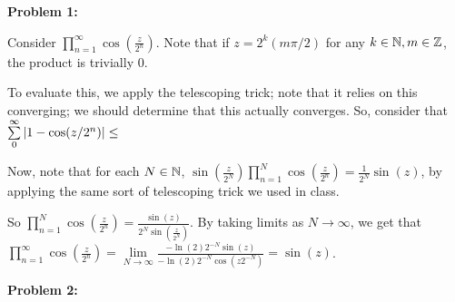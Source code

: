 \documentclass[a4paper,12pt]{article}
\begin{document}
{\bf Problem 1:}

Consider $\prod\limits_{n=1}^\infty \cos(\frac{z}{2^n})$. Note that if $z = 2^k(m\pi/2)$ for any $k \in \mathbb{N}, m \in \mathbb{Z}$, the product is trivially $0$. %

To evaluate this, we apply the telescoping trick; note that it relies on this converging; we should determine that this actually converges. So, consider that $\sum\limits_0^\infty \left\lvert 1-\cos(z/2^n) \right\rvert \leq $ %

Now, note that for each $N \in \mathbb{N}$, $\sin(\frac{z}{2^N}) \prod\limits_{n=1}^N \cos(\frac{z}{2^n}) = \frac{1}{2^N} \sin(z)$, by applying the same sort of telescoping trick we used in class.

So $\prod\limits_{n=1}^N \cos(\frac{z}{2^n}) = \frac{\sin(z)}{2^N \sin(\frac{z}{2^N})}$. By taking limits as $N \to \infty$, we get that $\prod\limits_{n=1}^\infty \cos(\frac{z}{2^n}) = \lim\limits_{N \to \infty} \frac{-\ln(2)2^{-N}\sin(z)}{-\ln(2)2^{-N}\cos(z2^{-N})} = \sin(z)$. %


\shunt

{\bf Problem 2:}

\shunt
\end{document}
